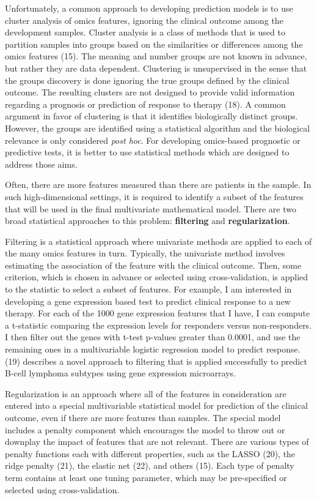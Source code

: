 \documentclass[11pt]{article}
\begin{document}
Unfortunately, a common approach to developing prediction models is to
use cluster analysis of omics features, ignoring the clinical outcome
among the development samples. Cluster analysis is a class of methods
that is used to partition samples into groups based on the similarities
or differences among the omics features (15). The meaning and number
groups are not known in advance, but rather they are data dependent.
Clustering is unsupervised in the sense that the groups discovery is
done ignoring the true groups defined by the clinical outcome. The
resulting clusters are not designed to provide valid information
regarding a prognosis or prediction of response to therapy (18). A
common argument in favor of clustering is that it identifies
biologically distinct groups. However, the groups are identified using a
statistical algorithm and the biological relevance is only considered
\emph{post hoc}. For developing omics-based prognostic or predictive
tests, it is better to use statistical methods which are designed to
address those aims.

Often, there are more features measured than there are patients in the
sample. In such high-dimensional settings, it is required to identify a
subset of the features that will be used in the final multivariate
mathematical model. There are two broad statistical approaches to this
problem: \textbf{filtering} and \textbf{regularization}.

Filtering is a statistical approach where univariate methods are applied
to each of the many omics features in turn. Typically, the univariate
method involves estimating the association of the feature with the
clinical outcome. Then, some criterion, which is chosen in advance or
selected using cross-validation, is applied to the statistic to select a
subset of features. For example, I am interested in developing a gene
expression based test to predict clinical response to a new therapy. For
each of the 1000 gene expression features that I have, I can compute a
t-statistic comparing the expression levels for responders versus
non-responders. I then filter out the genes with t-test p-values greater
than 0.0001, and use the remaining ones in a multivariable logistic
regression model to predict response. (19) describes a novel approach to
filtering that is applied successfully to predict B-cell lymphoma
subtypes using gene expression microarrays.

Regularization is an approach where all of the features in consideration
are entered into a special multivariable statistical model for
prediction of the clinical outcome, even if there are more features than
samples. The special model includes a penalty component which encourages
the model to throw out or downplay the impact of features that are not
relevant. There are various types of penalty functions each with
different properties, such as the LASSO (20), the ridge penalty (21),
the elastic net (22), and others (15). Each type of penalty term
contains at least one tuning parameter, which may be pre-specified or
selected using cross-validation.
\end{document}
